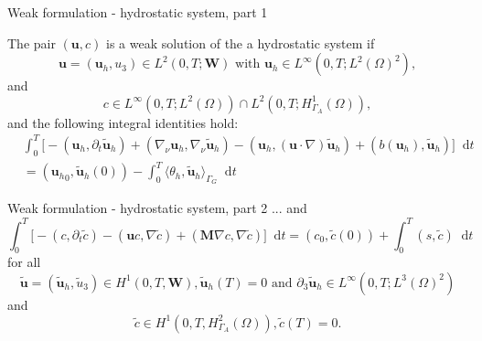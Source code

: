 \documentclass{beamer}
\newcommand*\diff{\mathop{}\!\mathrm{d}}
\begin{document}
\begin{frame}{Weak formulation - hydrostatic system, part 1}

The pair $(\mathbf{u}, c)$ is a weak solution of the a hydrostatic system if
$$\mathbf{u} = (\mathbf{u}_h, u_3) \in L^2 (0, T; \mathbf{W}) \text{ with } \mathbf{u}_h \in L^\infty (0,T; L^2(\Omega)^2),$$
and
$$c \in L^\infty(0,T; L^2(\Omega)) \cap L^2(0,T; H^1_{\Gamma_A}(\Omega)),$$ and the following integral identities hold:
%
\begin{equation} \nonumber
\begin{split}
& \int_0^T \bigg[ -(\mathbf{u}_h, \partial_t \mathbf{\tilde{u}}_h) + (\nabla_\nu \mathbf{u}_h, \nabla_\nu \mathbf{\tilde{u}}_h) - (\mathbf{u}_h, (\mathbf{u} \cdot \nabla) \mathbf{\tilde{u}}_h) + (b(\mathbf{u}_h), \mathbf{\tilde{u}}_h) \bigg ] \diff t \\
& = ({\mathbf{u}_h}_0, \mathbf{\tilde{u}}_h(0)) - \int_0^T \langle \theta_h, \mathbf{\tilde{u}}_h \rangle_{\Gamma_G} \diff t
\end{split}
\end{equation}
%
\end{frame}

\begin{frame}{Weak formulation - hydrostatic system, part 2}
... and
%
\begin{equation} \nonumber
\int_0^T \bigg[ -(c, \partial_t \tilde{c}) -(\mathbf{u}c, \nabla \tilde{c}) +  (\mathbf{M} \nabla c, \nabla \tilde{c}) \bigg ] \diff t = (c_0, \tilde{c}(0)) + \int_0^T (s,\tilde{c}) \diff t
\end{equation}
%
for all
$$\mathbf{\tilde{u}} = (\mathbf{\tilde{u}}_h, \tilde{u}_3) \in H^1 (0,T, \mathbf{W}), \mathbf{\tilde{u}}_h (T) = 0 \text{ and } \partial_3 \mathbf{\tilde{u}}_h \in L^\infty (0, T; L^3 (\Omega)^2)$$
and
$$\tilde{c} \in H^1 (0,T, H^2_{\Gamma_A} (\Omega)), \tilde{c} (T) = 0.$$

\end{frame}
\end{document}
